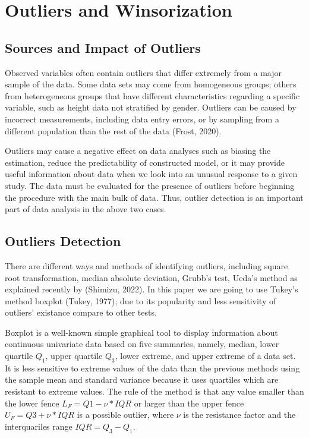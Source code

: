 \documentclass[notitlepage,12pt]{jedm}
\begin{document}
\hypertarget{outliers-and-winsorization}{%
\section{Outliers and Winsorization}\label{outliers-and-winsorization}}

\hypertarget{sources-and-impact-of-outliers}{%
\subsection{Sources and Impact of
Outliers}\label{sources-and-impact-of-outliers}}

Observed variables often contain outliers that differ extremely from a
major sample of the data. Some data sets may come from homogeneous
groups; others from heterogeneous groups that have different
characteristics regarding a specific variable, such as height data not
stratified by gender. Outliers can be caused by incorrect measurements,
including data entry errors, or by sampling from a different population
than the rest of the data (Frost, 2020).

Outliers may cause a negative effect on data analyses such as biasing
the estimation, reduce the predictability of constructed model, or it
may provide useful information about data when we look into an unusual
response to a given study. The data must be evaluated for the presence
of outliers before beginning the procedure with the main bulk of data.
Thus, outlier detection is an important part of data analysis in the
above two cases.

\hypertarget{outliers-detection}{%
\subsection{Outliers Detection}\label{outliers-detection}}

There are different ways and methods of identifying outliers, including
square root transformation, median absolute deviation, Grubb's test,
Ueda's method as explained recently by (Shimizu, 2022). In this paper we
are going to use Tukey's method boxplot (Tukey, 1977); due to its
popularity and less sensitivity of outliers' existance compare to other
tests.

Boxplot is a well-known simple graphical tool to display information
about continuous univariate data based on five summaries, namely,
median, lower quartile \(Q_1\), upper quartile \(Q_3\), lower extreme,
and upper extreme of a data set. It is less sensitive to extreme values
of the data than the previous methods using the sample mean and standard
variance because it uses quartiles which are resistant to extreme
values. The rule of the method is that any value smaller than the lower
fence \(L_F=Q1 - \nu*IQR\) or larger than the upper fence
\(U_F=Q3+ \nu*IQR\) is a possible outlier, where \(\nu\) is the
resistance factor and the interquariles range \(IQR=Q_3 -Q_1\).
\end{document}
